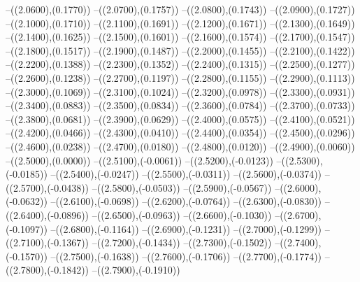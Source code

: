 {	--({\sx*(2.0600)},{\sy*(0.1770)})
	--({\sx*(2.0700)},{\sy*(0.1757)})
	--({\sx*(2.0800)},{\sy*(0.1743)})
	--({\sx*(2.0900)},{\sy*(0.1727)})
	--({\sx*(2.1000)},{\sy*(0.1710)})
	--({\sx*(2.1100)},{\sy*(0.1691)})
	--({\sx*(2.1200)},{\sy*(0.1671)})
	--({\sx*(2.1300)},{\sy*(0.1649)})
	--({\sx*(2.1400)},{\sy*(0.1625)})
	--({\sx*(2.1500)},{\sy*(0.1601)})
	--({\sx*(2.1600)},{\sy*(0.1574)})
	--({\sx*(2.1700)},{\sy*(0.1547)})
	--({\sx*(2.1800)},{\sy*(0.1517)})
	--({\sx*(2.1900)},{\sy*(0.1487)})
	--({\sx*(2.2000)},{\sy*(0.1455)})
	--({\sx*(2.2100)},{\sy*(0.1422)})
	--({\sx*(2.2200)},{\sy*(0.1388)})
	--({\sx*(2.2300)},{\sy*(0.1352)})
	--({\sx*(2.2400)},{\sy*(0.1315)})
	--({\sx*(2.2500)},{\sy*(0.1277)})
	--({\sx*(2.2600)},{\sy*(0.1238)})
	--({\sx*(2.2700)},{\sy*(0.1197)})
	--({\sx*(2.2800)},{\sy*(0.1155)})
	--({\sx*(2.2900)},{\sy*(0.1113)})
	--({\sx*(2.3000)},{\sy*(0.1069)})
	--({\sx*(2.3100)},{\sy*(0.1024)})
	--({\sx*(2.3200)},{\sy*(0.0978)})
	--({\sx*(2.3300)},{\sy*(0.0931)})
	--({\sx*(2.3400)},{\sy*(0.0883)})
	--({\sx*(2.3500)},{\sy*(0.0834)})
	--({\sx*(2.3600)},{\sy*(0.0784)})
	--({\sx*(2.3700)},{\sy*(0.0733)})
	--({\sx*(2.3800)},{\sy*(0.0681)})
	--({\sx*(2.3900)},{\sy*(0.0629)})
	--({\sx*(2.4000)},{\sy*(0.0575)})
	--({\sx*(2.4100)},{\sy*(0.0521)})
	--({\sx*(2.4200)},{\sy*(0.0466)})
	--({\sx*(2.4300)},{\sy*(0.0410)})
	--({\sx*(2.4400)},{\sy*(0.0354)})
	--({\sx*(2.4500)},{\sy*(0.0296)})
	--({\sx*(2.4600)},{\sy*(0.0238)})
	--({\sx*(2.4700)},{\sy*(0.0180)})
	--({\sx*(2.4800)},{\sy*(0.0120)})
	--({\sx*(2.4900)},{\sy*(0.0060)})
	--({\sx*(2.5000)},{\sy*(0.0000)})
	--({\sx*(2.5100)},{\sy*(-0.0061)})
	--({\sx*(2.5200)},{\sy*(-0.0123)})
	--({\sx*(2.5300)},{\sy*(-0.0185)})
	--({\sx*(2.5400)},{\sy*(-0.0247)})
	--({\sx*(2.5500)},{\sy*(-0.0311)})
	--({\sx*(2.5600)},{\sy*(-0.0374)})
	--({\sx*(2.5700)},{\sy*(-0.0438)})
	--({\sx*(2.5800)},{\sy*(-0.0503)})
	--({\sx*(2.5900)},{\sy*(-0.0567)})
	--({\sx*(2.6000)},{\sy*(-0.0632)})
	--({\sx*(2.6100)},{\sy*(-0.0698)})
	--({\sx*(2.6200)},{\sy*(-0.0764)})
	--({\sx*(2.6300)},{\sy*(-0.0830)})
	--({\sx*(2.6400)},{\sy*(-0.0896)})
	--({\sx*(2.6500)},{\sy*(-0.0963)})
	--({\sx*(2.6600)},{\sy*(-0.1030)})
	--({\sx*(2.6700)},{\sy*(-0.1097)})
	--({\sx*(2.6800)},{\sy*(-0.1164)})
	--({\sx*(2.6900)},{\sy*(-0.1231)})
	--({\sx*(2.7000)},{\sy*(-0.1299)})
	--({\sx*(2.7100)},{\sy*(-0.1367)})
	--({\sx*(2.7200)},{\sy*(-0.1434)})
	--({\sx*(2.7300)},{\sy*(-0.1502)})
	--({\sx*(2.7400)},{\sy*(-0.1570)})
	--({\sx*(2.7500)},{\sy*(-0.1638)})
	--({\sx*(2.7600)},{\sy*(-0.1706)})
	--({\sx*(2.7700)},{\sy*(-0.1774)})
	--({\sx*(2.7800)},{\sy*(-0.1842)})
	--({\sx*(2.7900)},{\sy*(-0.1910)})
}
